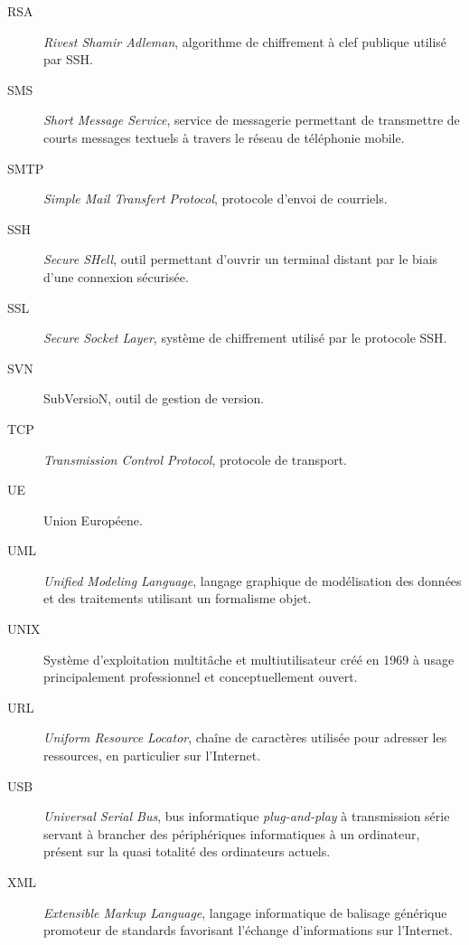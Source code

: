 \documentclass[a4paper, 11pt, final]{article}
\begin{document}
\begin{description}
\item[RSA] \emph{Rivest Shamir Adleman}, algorithme de chiffrement à clef publique utilisé par SSH.
\item[SMS] \emph{Short Message Service}, service de messagerie permettant de transmettre de courts messages textuels à travers le réseau de téléphonie mobile.
\item[SMTP] \emph{Simple Mail Transfert Protocol}, protocole d'envoi de courriels.
\item[SSH] \emph{Secure SHell}, outil permettant d'ouvrir un terminal distant par le biais d'une connexion sécurisée.
\item[SSL] \emph{Secure Socket Layer}, système de chiffrement utilisé par le protocole SSH.
\item[SVN] SubVersioN, outil de gestion de version.
\item[TCP] \emph{Transmission Control Protocol}, protocole de transport.
\item[UE] Union Européene.
\item[UML] \emph{Unified Modeling Language}, langage graphique de modélisation des données et des traitements utilisant un formalisme objet.
\item[UNIX] Système d'exploitation multitâche et multiutilisateur créé en 1969 à usage principalement professionnel et conceptuellement ouvert.
\item[URL] \emph{Uniform Resource Locator}, chaîne de caractères utilisée pour adresser les ressources, en particulier sur l'Internet.
\item[USB] \emph{Universal Serial Bus}, bus informatique \emph{plug-and-play} à transmission série servant à brancher des périphériques informatiques à un ordinateur, présent sur la quasi totalité des ordinateurs actuels.
\item[XML] \emph{Extensible Markup Language}, langage informatique de balisage générique promoteur de standards favorisant l'échange d'informations sur l'Internet.
\end{description}
\end{document}
